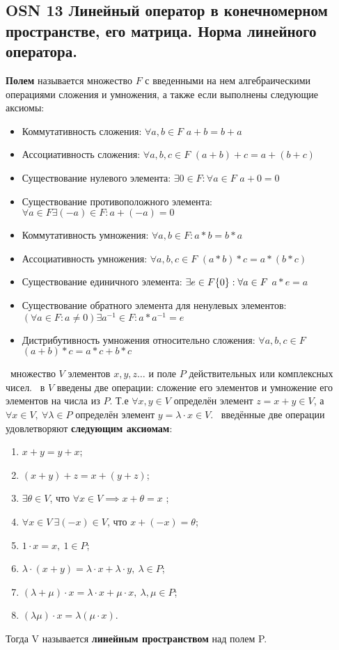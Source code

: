 \subsection{OSN 13 Линейный оператор в конечномерном пространстве, его матрица. Норма линейного оператора.}


\textbf{Полем} называется множество $F$ с введенными на нем алгебраическими операциями сложения и умножения, а также если выполнены следующие аксиомы:
\begin{itemize}
    \item Коммутативность сложения: $\forall a,b \in F$ $a + b = b + a$
    \item Ассоциативность сложения: $\forall a,b,c \in F$ $(a + b) + c = a + (b + c)$
    \item Существование нулевого элемента: $\exists 0 \in F: \forall a \in F$ $a + 0 = 0$
    \item Существование противоположного элемента: $\forall a \in F \exists (-a) \in F: a + (-a) = 0$
    \item Коммутативность умножения: $\forall a, b \in F: a * b = b * a$
    \item Ассоциативность умножения: $\forall a,b,c \in F$ $(a * b) * c = a * (b * c)$
    \item Существование единичного элемента: $\exists e \in F\\ \{0\}: \forall a \in F$ $a * e = a$ 
    \item Существование обратного элемента для ненулевых элементов: $ (\forall a \in F: a \neq 0) \exists a^{-1} \in F: a * a^{-1} = e$
    \item Дистрибутивность умножения относительно сложения: $\forall a,b,c \in F$ $(a + b) *c = a * c + b * c$
\end{itemize}


\faEye \ множество $V$ элементов $x, y, z\dots$ и поле $P$ действительных или комплексных чисел. \mathLet \ в $V$ введены две операции: сложение его элементов и умножение его элементов на числа из $P$. 
Т.е $\forall x,y \in V$ определён элемент $z = x+y \in V$, а $\forall x \in V, ~ \forall \lambda \in P$ определён элемент $y = \lambda \cdot x \in  V$. \mathLet \ введённые две операции удовлетворяют \textbf{следующим аксиомам}:
\begin{enumerate}
    \item $x+y=y+x$;
    \item $(x+y)+z=x+(y+z)$;
    \item $\exists \theta\in V$, что $\forall x\in V \implies x+\theta=x$ ;
    \item $\forall x \in V ~ \exists (-x) \in V$, что $x + (-x) = \theta$;
    \item $1 \cdot x = x,~1 \in P$;
    \item $\lambda \cdot(x+y)=\lambda \cdot x+\lambda \cdot y,~\lambda \in P$;
    \item $(\lambda +\mu)\cdot x=\lambda \cdot x+\mu \cdot x,~\lambda,\mu \in P$;
    \item $(\lambda \mu )\cdot x = \lambda (\mu \cdot x)$.
\end{enumerate}
Тогда V называется \textbf{линейным пространством} над полем P.

